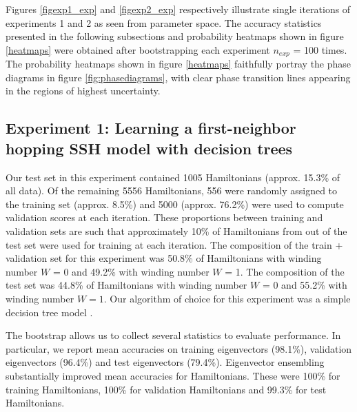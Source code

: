 \documentclass[fleqn,10pt]{wlscirep}
\begin{document}
Figures \ref{figexp1_exp} and \ref{figexp2_exp} respectively illustrate single iterations of experiments 1 and 2 as seen from parameter space. The accuracy statistics presented in the following subsections and probability heatmaps shown in figure \ref{heatmaps} were obtained after bootstrapping each experiment $n_{exp}$ = 100 times. The probability heatmaps shown in figure \ref{heatmaps} faithfully portray the phase diagrams in figure \ref{fig:phasediagrams}, with clear phase transition lines appearing in the regions of highest uncertainty.

\subsection*{Experiment 1: Learning a first-neighbor hopping SSH model with decision trees}

Our test set in this experiment contained 1005 Hamiltonians (approx. 15.3\% of all data). Of the remaining 5556 Hamiltonians, 556 were randomly assigned to the training set (approx. 8.5\%) and 5000 (approx. 76.2\%) were used to compute validation scores at each iteration. These proportions between training and validation sets are such that approximately 10\%  of Hamiltonians from out of the test set were used for training at each iteration. The composition of the train + validation set for this experiment was 50.8\% of Hamiltonians with winding number $W$ = 0 and 49.2\% with winding number $W$ = 1. The composition of the test set was 44.8\% of Hamiltonians with winding number $W$ = 0 and 55.2\% with winding number $W=1$. Our algorithm of choice for this experiment was a simple decision tree model \cite{breiman2017classification}.

The bootstrap allows us to collect several statistics to evaluate performance. In particular, we report mean accuracies on training eigenvectors (98.1\%), validation eigenvectors (96.4\%) and test eigenvectors (79.4\%). Eigenvector ensembling substantially improved mean accuracies for Hamiltonians. These were 100\% for training Hamiltonians, 100\% for validation Hamiltonians and 99.3\% for test Hamiltonians.
\end{document}
